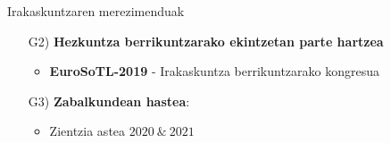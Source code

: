 \documentclass[
 10pt,%
 compress,%
 t,       %
 xcolor=svgnames
]{beamer}
\theoremstyle{definition} \newtheorem{definicion}{Definicion}[section]
\theoremstyle{propiedades} \newtheorem{propiedades}{Propiedades}[section]
\begin{document}

\begin{frame}{Irakaskuntzaren merezimenduak} 


\medskip
\small

\begin{itemize}
\item[G2)] \textbf{Hezkuntza berrikuntzarako ekintzetan parte hartzea}
\small

\medskip
\begin{itemize}
\item \textbf{EuroSoTL-2019} - Irakaskuntza berrikuntzarako kongresua





\end{itemize}


\medskip

\item[G3)] \textbf{Zabalkundean hastea}:  
	
\medskip
	
	\begin{itemize}
		\item Zientzia astea $2020 \ \& \ 2021$


\end{itemize}
\end{itemize}
\end{frame}
\end{document}

